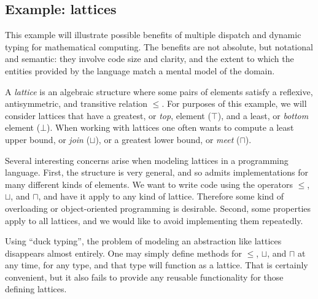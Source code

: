 \subsection{Example: lattices}

This example will illustrate possible benefits of multiple dispatch and
dynamic typing for mathematical computing.
The benefits are not absolute, but notational and semantic:
they involve code size and clarity, and the extent to which the entities
provided by the language match a mental model of the domain.

A \emph{lattice} is an algebraic structure where some pairs of elements
satisfy a reflexive, antisymmetric, and transitive relation $\leq$.
For purposes of this example, we will consider lattices that have
a greatest, or \emph{top}, element ($\top$), and a least, or \emph{bottom}
element ($\bot$). When working with lattices one often wants to compute
a least upper bound, or \emph{join} ($\sqcup$), or a greatest lower bound,
or \emph{meet} ($\sqcap$).

Several interesting concerns arise when modeling lattices in a programming
language. First, the structure is very general, and so admits implementations
for many different kinds of elements. We want to write code using
the operators $\leq$, $\sqcup$, and $\sqcap$, and have it apply to any kind
of lattice. Therefore some kind of overloading or object-oriented programming
is desirable. Second, some properties apply to all lattices, and we would
like to avoid implementing them repeatedly.

Using ``duck typing'', the problem of modeling an abstraction like lattices
disappears almost entirely. One may simply define methods for
$\leq$, $\sqcup$, and $\sqcap$ at any time, for any type, and that type will
function as a lattice. That is certainly convenient, but it also fails to
provide any reusable functionality for those defining lattices.



